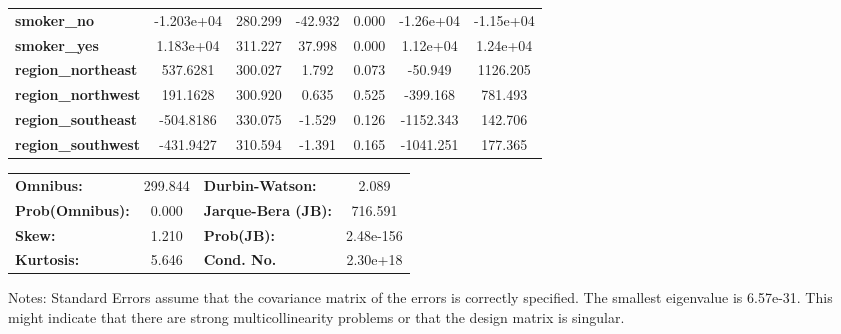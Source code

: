 \begin{center}
\begin{tabular}{lcccccc}
\textbf{smoker\_no}        &   -1.203e+04  &      280.299     &   -42.932  &         0.000        &    -1.26e+04    &    -1.15e+04     \\
\textbf{smoker\_yes}       &    1.183e+04  &      311.227     &    37.998  &         0.000        &     1.12e+04    &     1.24e+04     \\
\textbf{region\_northeast} &     537.6281  &      300.027     &     1.792  &         0.073        &      -50.949    &     1126.205     \\
\textbf{region\_northwest} &     191.1628  &      300.920     &     0.635  &         0.525        &     -399.168    &      781.493     \\
\textbf{region\_southeast} &    -504.8186  &      330.075     &    -1.529  &         0.126        &    -1152.343    &      142.706     \\
\textbf{region\_southwest} &    -431.9427  &      310.594     &    -1.391  &         0.165        &    -1041.251    &      177.365     \\
\bottomrule
\end{tabular}
\begin{tabular}{lclc}
\textbf{Omnibus:}       & 299.844 & \textbf{  Durbin-Watson:     } &     2.089  \\
\textbf{Prob(Omnibus):} &   0.000 & \textbf{  Jarque-Bera (JB):  } &   716.591  \\
\textbf{Skew:}          &   1.210 & \textbf{  Prob(JB):          } & 2.48e-156  \\
\textbf{Kurtosis:}      &   5.646 & \textbf{  Cond. No.          } &  2.30e+18  \\
\bottomrule
\end{tabular}
\end{center}

Notes: \newline
 [1] Standard Errors assume that the covariance matrix of the errors is correctly specified. \newline
 [2] The smallest eigenvalue is 6.57e-31. This might indicate that there are \newline
 strong multicollinearity problems or that the design matrix is singular.